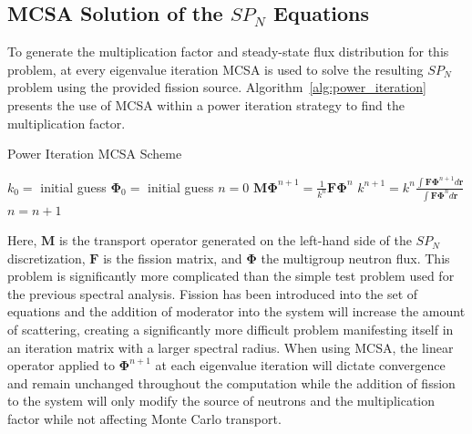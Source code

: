 \documentclass[letterpaper,11pt]{article}
\begin{document}
\subsection{MCSA Solution of the $SP_N$ Equations}
\label{subsec:mcsa_solution}
To generate the multiplication factor and steady-state flux
distribution for this problem, at every eigenvalue iteration MCSA is
used to solve the resulting $SP_N$ problem using the provided fission
source. Algorithm~\ref{alg:power_iteration} presents the use of MCSA
within a power iteration strategy to find the multiplication factor.
\begin{algorithm}[h!]
  \caption{Power Iteration MCSA Scheme}
  \label{alg:power_iteration}
  \begin{algorithmic}
    \State $k_0 =$ initial guess
    \State $\mathbf{\Phi}_0 =$ initial guess
    \State $n = 0$
    \State $\mathbf{M} \mathbf{\Phi}^{n+1} = \frac{1}{k^n} \mathbf{F} \mathbf{\Phi}^n$
    \State $k^{n+1} = k^n \frac{\int \mathbf{F} \mathbf{\Phi}^{n+1} d\mathbf{r}}{\int
      \mathbf{F} \mathbf{\Phi}^n d\mathbf{r}}$
    \State $n = n+1$
    \EndWhile
  \end{algorithmic}
\end{algorithm}
Here, $\mathbf{M}$ is the transport operator generated on the
left-hand side of the $SP_N$ discretization, $\mathbf{F}$ is the
fission matrix, and $\mathbf{\Phi}$ the multigroup neutron flux. This
problem is significantly more complicated than the simple test problem
used for the previous spectral analysis. Fission has been introduced
into the set of equations and the addition of moderator into the
system will increase the amount of scattering, creating a
significantly more difficult problem manifesting itself in an
iteration matrix with a larger spectral radius. When using MCSA, the
linear operator applied to $\mathbf{\Phi}^{n+1}$ at each eigenvalue
iteration will dictate convergence and remain unchanged throughout the
computation while the addition of fission to the system will only
modify the source of neutrons and the multiplication factor while not
affecting Monte Carlo transport.
\end{document}
